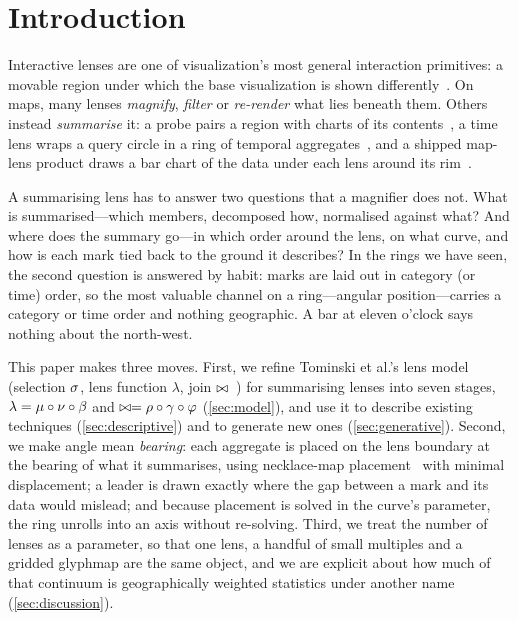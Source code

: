 \section{Introduction}
\label{sec:intro}

Interactive lenses are one of visualization's most general interaction
primitives: a movable region under which the base visualization is shown
differently~\cite{bier1993toolglass,tominski2014star,tominski2017survey}. On
maps, many lenses \emph{magnify}, \emph{filter} or \emph{re-render} what lies
beneath them. Others instead \emph{summarise} it: a probe pairs a
region with charts of its contents~\cite{butkiewicz2008probes}, a time lens
wraps a query circle in a ring of temporal aggregates~\cite{tominski2012stacking},
and a shipped map-lens product draws a bar chart of the data under each lens
around its rim~\cite{visquill}.

A summarising lens has to answer two questions that a magnifier does not. What
is summarised---which members, decomposed how, normalised against what? And
where does the summary go---in which order around the lens, on what curve, and
how is each mark tied back to the ground it describes? In the rings we have
seen, the second question is answered by habit: marks are laid out in category
(or time) order, so the most valuable channel on a ring---angular
position---carries a category or time order and nothing geographic. A bar at eleven
o'clock says nothing about the north-west.

This paper makes three moves. First, we refine Tominski et al.'s lens model
(selection $\sigma$, lens function $\lambda$, join
$\bowtie$~\cite{tominski2017survey}) for summarising lenses into seven stages,
$\lambda=\mu\circ\nu\circ\beta$ and $\bowtie=\rho\circ\gamma\circ\varphi$
(\cref{sec:model}), and use it to describe existing techniques
(\cref{sec:descriptive}) and to generate new ones (\cref{sec:generative}).
Second, we make angle mean \emph{bearing}: each aggregate is placed on the lens
boundary at the bearing of what it summarises, using necklace-map
placement~\cite{speckmann2010necklace} with minimal displacement; a leader is
drawn exactly where the gap between a mark and its data would mislead; and
because placement is solved in the curve's parameter, the ring unrolls into an
axis without re-solving. Third, we treat the number of lenses as a parameter,
so that one lens, a handful of small multiples and a gridded glyphmap are the
same object, and we are explicit about how much of that continuum is
geographically weighted statistics under another name (\cref{sec:discussion}).

